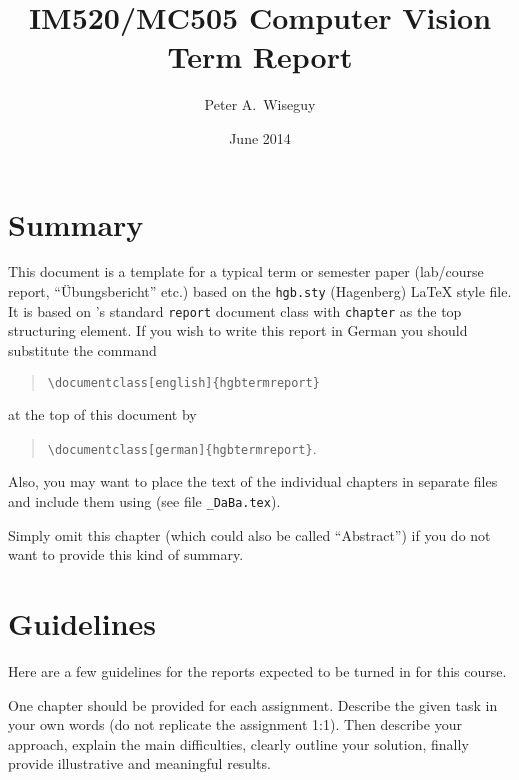 \documentclass[a4paper,english,11pt]{report}
\author{Peter A.\ Wiseguy}
\title{IM520/MC505 Computer Vision \\ Term Report}
\date{June 2014}
\begin{document}
\maketitle
\tableofcontents

\chapter*{Summary}

This document is a template for a typical term or semester paper (lab/course report, 
``Übungsbericht'' etc.) based on the \texttt{hgb.sty} (Hagenberg) LaTeX style file.
It is based on \latex's standard \texttt{report} document class with \texttt{chapter} as the top 
structuring element.
If you wish to write this report in German you should substitute the command
\begin{quote}
 \verb!\documentclass[english]{hgbtermreport}! 
\end{quote}
at the top of this document by
\begin{quote}
 \verb!\documentclass[german]{hgbtermreport}!.
\end{quote}
Also, you may want to place the text of the individual chapters in separate files and 
include them using \verb!! 
(see file \verb!_DaBa.tex!).

Simply omit this chapter (which could also be called ``Abstract'') if you do not want to provide this kind of summary.


\chapter{Guidelines}

Here are a few guidelines for the reports expected to be turned in for this course.

One chapter should be provided for each assignment.
Describe the given task in your own words (do not replicate the assignment 1:1). 
Then describe your approach, explain the main difficulties, clearly outline your solution, finally provide illustrative and meaningful results. 
\end{document}
